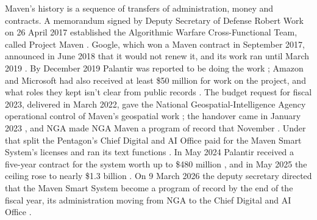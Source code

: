 
Maven's history is a sequence of transfers of administration, money and contracts. A memorandum signed by Deputy Secretary of Defense Robert Work on 26 April 2017 established the Algorithmic Warfare Cross-Functional Team, called Project Maven \autocite{work2017maven,allen2017maven}. Google, which won a Maven contract in September 2017, announced in June 2018 that it would not renew it, and its work ran until March 2019 \autocite{fang2018maven,conger2018maven}. By December 2019 Palantir was reported to be doing the work \autocite{peterson2019palantir}; Amazon and Microsoft had also received at least \$50 million for work on the project, and what roles they kept isn't clear from public records \autocite{poulson2023maven}. The budget request for fiscal 2023, delivered in March 2022, gave the National Geospatial-Intelligence Agency operational control of Maven's geospatial work \autocite{breakingdefense2022nga}; the handover came in January 2023 \autocite{albon2023nga}, and NGA made NGA Maven a program of record that November \autocite{nga2023programrecord}. Under that split the Pentagon's Chief Digital and AI Office paid for the Maven Smart System's licenses and ran its text functions \autocite{csis2026maven}. In May 2024 Palantir received a five-year contract for the system worth up to \$480 million \autocite{register2024maven,defensescoop2025maven}, and in May 2025 the ceiling rose to nearly \$1.3 billion \autocite{defensescoop2025maven}. On 9 March 2026 the deputy secretary directed that the Maven Smart System become a program of record by the end of the fiscal year, its administration moving from NGA to the Chief Digital and AI Office \autocite{defensescoop2026maven}.
